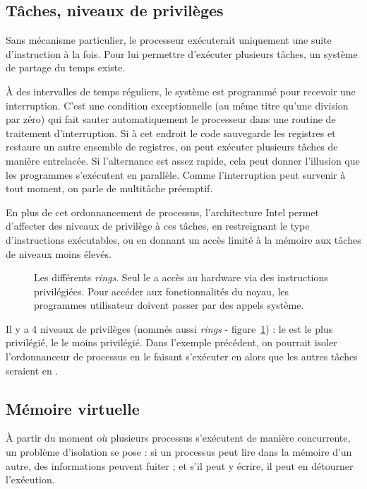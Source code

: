 \subsection{Tâches, niveaux de privilèges}
\label{sec:taches}

Sans mécanisme particulier, le processeur exécuterait uniquement une suite
d'instruction à la fois. Pour lui permettre d'exécuter plusieurs tâches, un
système de partage du temps existe.

À des intervalles de temps réguliers, le système est programmé pour recevoir une
interruption. C'est une condition exceptionnelle (au même titre qu'une division
par zéro) qui fait sauter automatiquement le processeur dans une routine de
traitement d'interruption. Si à cet endroit le code sauvegarde les registres et
restaure un autre ensemble de registres, on peut exécuter plusieurs tâches de
manière entrelacée. Si l'alternance est assez rapide, cela peut donner
l'illusion que les programmes s'exécutent en parallèle. Comme l'interruption
peut survenir à tout moment, on parle de multitâche préemptif.

En plus de cet ordonnancement de processus, l'architecture Intel permet
d'affecter des niveaux de privilège à ces tâches, en restreignant le type
d'instructions exécutables, ou en donnant un accès limité à la mémoire aux
tâches de niveaux moins élevés.

\begin{figure}

\caption[Les différents \emph{rings}]{
  Les différents \emph{rings}. Seul le  a accès au hardware
  via des instructions privilégiées. Pour accéder aux fonctionnalités du noyau,
  les programmes utilisateur doivent passer par des appels système.}
\label{fig:rings}
\end{figure}

Il y a 4 niveaux de privilèges (nommés aussi \emph{rings} -
figure~\ref{fig:rings}) : le  est le plus privilégié, le  le
moins privilégié. Dans l'exemple précédent, on pourrait isoler l'ordonnanceur de
processus en le faisant s'exécuter en  alors que les autres tâches
seraient en .

\subsection{Mémoire virtuelle}

À partir du moment où plusieurs processus s'exécutent de manière concurrente, un
problème d'isolation se pose : si un processus peut lire dans la mémoire d'un
autre, des informations peuvent fuiter ; et s'il peut y écrire, il peut en
détourner l'exécution.

